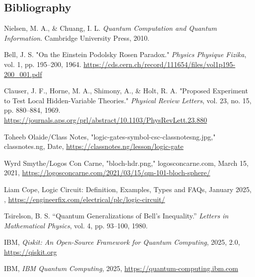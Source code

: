 \documentclass[12pt]{article}
\begin{document}
\newpage
\subsection{Bibliography}
\begin{thebibliography}{9}

     Nielsen, M. A., \& Chuang, I. L. \textit{Quantum Computation and Quantum Information}. Cambridge University Press, 2010.

     Bell, J. S. "On the Einstein Podolsky Rosen Paradox." \textit{Physics Physique Fizika}, vol. 1, pp. 195–200, 1964. \url{https://cds.cern.ch/record/111654/files/vol1p195-200_001.pdf}

     Clauser, J. F., Horne, M. A., Shimony, A., \& Holt, R. A. "Proposed Experiment to Test Local Hidden-Variable Theories." \textit{Physical Review Letters}, vol. 23, no. 15, pp. 880–884, 1969. \url{https://journals.aps.org/prl/abstract/10.1103/PhysRevLett.23.880}

     Toheeb Olaide/Class Notes, "logic-gates-symbol-csc-classnotesng.jpg," classnotes.ng, Date, \url{https://classnotes.ng/lesson/logic-gate}

     Wyrd Smythe/Logos Con Carne, "bloch-hdr.png," logosconcarne.com, March 15, 2021, \url{https://logosconcarne.com/2021/03/15/qm-101-bloch-sphere/}

     Liam Cope, Logic Circuit: Definition, Examples, Types and FAQs, January 2025, , \url{https://engineerfix.com/electrical/plc/logic-circuit/}

     Tsirelson, B. S. “Quantum Generalizations of Bell’s Inequality.” \textit{Letters in Mathematical Physics}, vol. 4, pp. 93–100, 1980.

     IBM, \textit{Qiskit: An Open-Source Framework for Quantum Computing}, 2025, 2.0, \url{https://qiskit.org}

     IBM, \textit{IBM Quantum Computing}, 2025, \url{https://quantum-computing.ibm.com}

\end{thebibliography}
\end{document}
